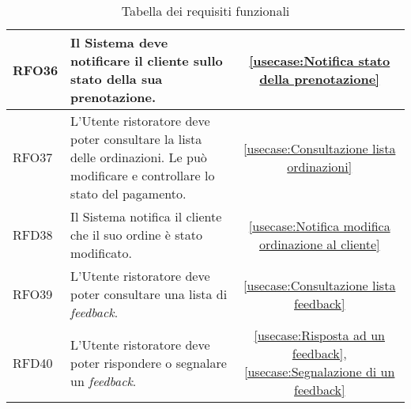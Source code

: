 \begin{table}[H]
\begin{tabularx}{\textwidth}{l|X|c}
		\hline
		RFO36       & Il Sistema deve notificare il cliente sullo stato della sua prenotazione.                                                      & \autoref{usecase:Notifica stato della prenotazione}                                                                                                   \\
		\hline
		RFO37       & L'Utente ristoratore deve poter consultare la lista delle ordinazioni. Le può modificare e controllare lo stato del pagamento. & \autoref{usecase:Consultazione lista ordinazioni}                                                                                                     \\
		\hline
		RFD38       & Il Sistema notifica il cliente che il suo ordine è stato modificato.                                                           & \autoref{usecase:Notifica modifica ordinazione al cliente}                                                                                            \\
		\hline
		RFO39       & L'Utente ristoratore deve poter consultare una lista di \textit{feedback}.                                                     & \autoref{usecase:Consultazione lista feedback}                                                                                                        \\
		\hline
		RFD40       & L'Utente ristoratore deve poter rispondere o segnalare un \textit{feedback}.                                                   & \autoref{usecase:Risposta ad un feedback}, \autoref{usecase:Segnalazione di un feedback}                                                              \\
		\hline
	\end{tabularx}
	\caption{Tabella dei requisiti funzionali}
\end{table}


